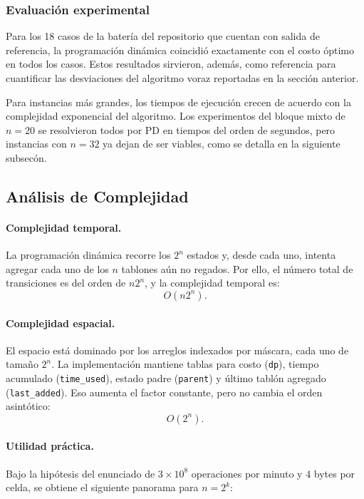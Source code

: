 \documentclass[12pt,a4paper]{article}
\begin{document}
\subsubsection{Evaluaci\'on experimental}

Para los 18 casos de la bater\'ia del repositorio que cuentan con salida de referencia, la programaci\'on din\'amica coincidi\'o exactamente con el costo \'optimo en todos los casos. Estos resultados sirvieron, adem\'as, como referencia para cuantificar las desviaciones del algoritmo voraz reportadas en la secci\'on anterior.

Para instancias m\'as grandes, los tiempos de ejecuci\'on crecen de acuerdo con la complejidad exponencial del algoritmo. Los experimentos del bloque mixto de \(n=20\) se resolvieron todos por PD en tiempos del orden de segundos, pero instancias con \(n=32\) ya dejan de ser viables, como se detalla en la siguiente subsec\'on.

\subsection{An\'alisis de Complejidad}

\paragraph{Complejidad temporal.}
La programaci\'on din\'amica recorre los \(2^n\) estados y, desde cada uno, intenta agregar cada uno de los \(n\) tablones a\'un no regados. Por ello, el n\'umero total de transiciones es del orden de \(n2^n\), y la complejidad temporal es:
\[
O(n2^n).
\]

\paragraph{Complejidad espacial.}
El espacio est\'a dominado por los arreglos indexados por m\'ascara, cada uno de tama\~no \(2^n\). La implementaci\'on mantiene tablas para costo (\texttt{dp}), tiempo acumulado (\texttt{time\_used}), estado padre (\texttt{parent}) y \'ultimo tabl\'on agregado (\texttt{last\_added}). Eso aumenta el factor constante, pero no cambia el orden asint\'otico:
\[
O(2^n).
\]

\paragraph{Utilidad pr\'actica.}
Bajo la hip\'otesis del enunciado de \(3\times 10^8\) operaciones por minuto y 4 bytes por celda, se obtiene el siguiente panorama para \(n = 2^k\):
\end{document}
